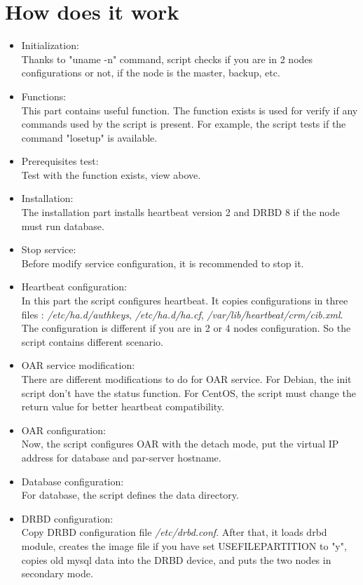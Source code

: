 \documentclass[a4paper,10pt]{report}
\begin{document}
\section{How does it work}
\begin{itemize}
 \item Initialization: \\
Thanks to "uname -n" command, script checks if you are in 2 nodes configurations or not, if the node is the master, backup, etc.
 \item Functions:\\
This part contains useful function. The function exists is used for verify if any commands used by the script is present. For example, the script tests if the command "losetup" is available.
 \item Prerequisites test:\\
Test with the function exists, view above.
 \item Installation:\\
The installation part installs heartbeat version 2 and DRBD 8 if the node must run database.
 \item Stop service:\\
Before modify service configuration, it is recommended to stop it.
 \item Heartbeat configuration:\\
In this part the script configures heartbeat. It copies configurations in three files : \textit{/etc/ha.d/authkeys}, \textit{/etc/ha.d/ha.cf}, \textit{/var/lib/heartbeat/crm/cib.xml}. The configuration is different if you are in 2 or 4 nodes configuration. So the script contains different scenario.
 \item OAR service modification:\\
There are different modifications to do for OAR service. For Debian, the init script don't have the status function. For CentOS, the script must change the return value for better heartbeat compatibility.
 \item OAR configuration:\\
Now, the script configures OAR with the detach mode, put the virtual IP address for database and par-server hostname.
 \item Database configuration:\\
For database, the script defines the data directory.
 \item DRBD configuration:\\
Copy DRBD configuration file \textit{/etc/drbd.conf}. After that, it loads drbd module, creates the image file if you have set USEFILEPARTITION to "y", copies old mysql data into the DRBD device, and puts the two nodes in secondary mode.

\end{itemize}
\end{document}
